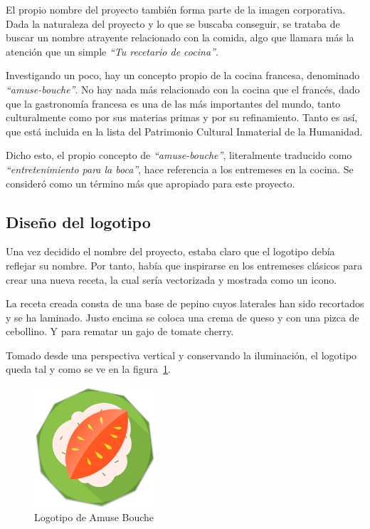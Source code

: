 El propio nombre del proyecto también forma parte de la imagen corporativa. Dada
la naturaleza del proyecto y lo que se buscaba conseguir, se trataba de buscar
un nombre atrayente relacionado con la comida, algo que llamara más la atención
que un simple \textit{``Tu recetario de cocina''}.

Investigando un poco, hay un concepto propio de la cocina
francesa,\cite{gastronomia-francia} denominado \textit{``amuse-bouche''}. No hay
nada más relacionado con la cocina que el francés, dado que la gastronomía
francesa es una de las más importantes del mundo, tanto culturalmente como por
sus materias primas y por su refinamiento. Tanto es así, que está incluida en la
lista del Patrimonio Cultural Inmaterial de la Humanidad.

Dicho esto, el propio concepto de \textit{``amuse-bouche''}, literalmente
traducido como \textit{``entretenimiento para la boca''},\cite{amuse-bouche}
hace referencia a los entremeses en la cocina. Se consideró como un término más
que apropiado para este proyecto.


\subsection{Diseño del logotipo}

Una vez decidido el nombre del proyecto, estaba claro que el logotipo debía
reflejar su nombre. Por tanto, había que inspirarse en los entremeses clásicos
para crear una nueva receta, la cual sería vectorizada y mostrada como un icono.

La receta creada consta de una base de pepino cuyos laterales han sido
recortados y se ha laminado. Justo encima se coloca una crema de queso y
con una pizca de cebollino. Y para rematar un gajo de tomate cherry.

Tomado desde una perspectiva vertical y conservando la iluminación, el logotipo
queda tal y como se ve en la figura~\ref{fig:logotipo}.

\begin{figure}[htbp]
  \centering
  \includegraphics[width=0.4\textwidth]{cap5/img/logotipo}
  \caption{Logotipo de Amuse Bouche}
  \label{fig:logotipo}
\end{figure}


